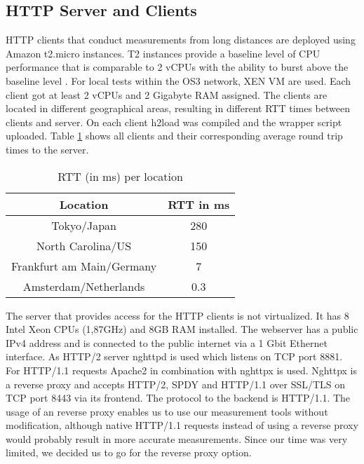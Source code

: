 \subsection{HTTP Server and Clients}
\label{subsec:server_client}
HTTP clients that conduct measurements from long distances are deployed using Amazon t2.micro instances. T2 instances provide a baseline level of CPU performance that is comparable to 2 vCPUs with the ability to burst above the baseline level \cite{amazon-ts}. For local tests within the OS3 network, XEN VM are used. Each client got at least 2 vCPUs and 2 Gigabyte RAM assigned. The clients are located in different geographical areas, resulting in different RTT times between clients and server. On each client h2load was compiled and the wrapper script uploaded. Table \ref{table:locations} shows all clients and their corresponding average round trip times to the server.

\begin{table}[h]
	\centering
\begin{tabular}{ | c | c | }

\hline
\textbf{Location} & \textbf{RTT in ms}\\ \hline \hline
Tokyo/Japan &  280\\ \hline
North Carolina/US &  150\\ \hline 
Frankfurt am Main/Germany &  7\\ \hline
Amsterdam/Netherlands &  0.3\\

\hline
\end{tabular}
\caption{RTT (in ms) per location}
\label{table:locations}
\end{table}

The server that provides access for the HTTP clients is not virtualized. It has 8 Intel Xeon CPUs (1,87GHz) and 8GB RAM installed. The webserver has a public IPv4 address and is connected to the public internet via a 1 Gbit Ethernet interface. As HTTP/2 server nghttpd \cite{nghttp} is used which listens on TCP port 8881. For HTTP/1.1 requests Apache2 \cite{apache} in combination with nghttpx \cite{nghttpx} is used. Nghttpx is a reverse proxy and accepts HTTP/2, SPDY and HTTP/1.1 over SSL/TLS on TCP port 8443 via its frontend. The protocol to the backend is HTTP/1.1. The usage of an reverse proxy enables us to use our measurement tools without modification, although native HTTP/1.1 requests instead of using a reverse proxy would probably result in more accurate measurements. Since our time was very limited, we decided us to go for the reverse proxy option.

